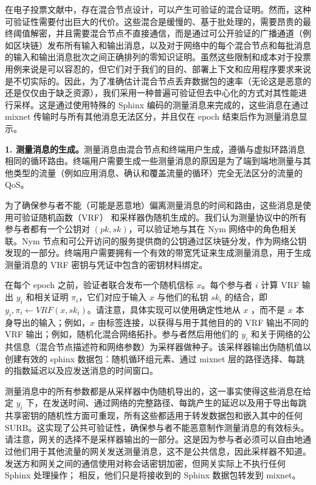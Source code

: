 \documentclass{article}
\begin{document}
	在电子投票文献中，存在混合节点设计，可以产生可验证的混合证明\cite{ref1, ref4, ref50}。然而，这种可验证性需要付出巨大的代价。这些混合是缓慢的、基于批处理的，需要昂贵的最终阈值解密，并且需要混合节点不直接通信，而是通过可公开验证的广播通道（例如区块链）发布所有输入和输出消息，以及对于网络中的每个混合节点和每批消息的输入和输出消息批次之间正确排列的零知识证明。虽然这些限制和成本对于投票用例来说是可以容忍的，但它们对于我们的目的、部署上下文和应用程序要求来说是不切实际的。因此，为了准确估计混合节点丢弃数据包的速率（无论这是恶意的还是仅仅由于缺乏资源），我们采用一种普遍可验证但去中心化的方式对其性能进行采样。这是通过使用特殊的 Sphinx 编码的测量消息来完成的，这些消息在通过 mixnet 传输时与所有其他消息无法区分，并且仅在 epoch 结束后作为测量消息显示。\newline

	\textbf{1. 测量消息的生成。}测量消息由混合节点和终端用户生成，遵循与虚拟环路消息相同的循环路由。终端用户需要生成一些测量消息的原因是为了端到端地测量与其他类型的流量（例如应用消息、确认和覆盖流量的循环）完全无法区分的流量的 QoS。\newline

	为了确保参与者不能（可能是恶意地）偏离测量消息的时间和路由，这些消息是使用可验证随机函数（VRF）\cite{ref80} 和采样器伪随机生成的。我们认为测量协议中的所有参与者都有一个公钥对 $(pk, sk)$，可以验证地与其在 Nym 网络中的角色相关联。Nym 节点和可公开访问的服务提供商的公钥通过区块链分发，作为网络公钥发现的一部分。终端用户需要拥有一个有效的带宽凭证来生成测量消息，用于生成测量消息的 VRF 密钥与凭证中包含的密钥材料绑定。\newline

	在每个 epoch 之前，验证者联合发布一个随机信标 $x$。每个参与者 $i$ 计算 VRF 输出 $y_{i}$ 和相关证明 $\pi_{i}$，它们对应于输入 $x$ 与他们的私钥 $sk_{i}$ 的结合，即 $y_{i}, \pi_{i} \leftarrow V R F\left(x, s k_{i}\right)$。请注意，具体实现可以使用确定性地从 $x$ ，而不是 $x$ 本身导出的输入；例如，$x$ 由标签连接，以获得与用于其他目的的 VRF 输出不同的 VRF 输出；例如，随机化混合网络拓扑。参与者然后用他们的 $y_{i}$ 和关于网络的公共信息（混合节点描述符和网络参数）为采样器做种子。该采样器输出伪随机值以创建有效的 sphinx 数据包：随机循环组元素、通过 mixnet 层的路径选择、每跳的指数延迟以及应发送消息的时间窗口。\newline

	测量消息中的所有参数都是从采样器中伪随机导出的，这一事实使得这些消息在给定 $y_{i}$ 下，在发送时间、通过网络的完整路径、每跳产生的延迟以及用于导出每跳共享密钥的随机性方面可重现，所有这些都适用于转发数据包和嵌入其中的任何 SURB。这实现了公共可验证性，确保参与者不能恶意制作测量消息的有效标头。请注意，网关的选择不是采样器输出的一部分。这是因为参与者必须可以自由地通过他们用于其他流量的网关发送测量消息，这不是公共信息，因此采样器不知道。发送方和网关之间的通信使用对称会话密钥加密，但网关实际上不执行任何 Sphinx 处理操作； 相反，他们只是将接收到的 Sphinx 数据包转发到 mixnet。\newline
\end{document}
